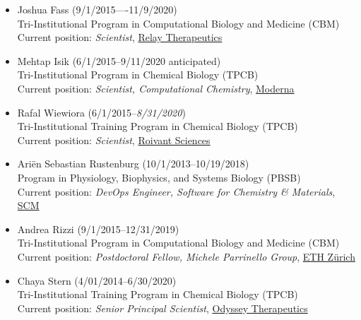 \documentclass[10pt]{article}
\begin{document}
\begin{itemize}

  \item Joshua Fass (9/1/2015----11/9/2020)\\
  Tri-Institutional Program in Computational Biology and Medicine (CBM)\\
  Current position: \emph{Scientist}, \href{https://relaytx.com/}{Relay Therapeutics}
  
  \item Mehtap Isik (6/1/2015--9/11/2020 anticipated)\\
  Tri-Institutional Program in Chemical Biology (TPCB)\\
  Current position: \emph{Scientist, Computational Chemistry}, \href{https://www.modernatx.com/}{Moderna}
  
  \item Rafal Wiewiora (6/1/2015--\emph{8/31/2020})\\
  Tri-Institutional Training Program in Chemical Biology (TPCB)\\
  Current position: \emph{Scientist}, \href{redesignscience.com}{Roivant Sciences}
  
  \item Ari\"{e}n Sebastian Rustenburg (10/1/2013--10/19/2018)\\
  Program in Physiology, Biophysics, and Systems Biology (PBSB)\\
  Current position: \emph{DevOps Engineer, Software for Chemistry \& Materials}, \href{https://www.scm.com/}{SCM}

  \item Andrea Rizzi (9/1/2015--12/31/2019)\\
  Tri-Institutional Program in Computational Biology and Medicine (CBM)\\
  Current position: \emph{Postdoctoral Fellow, Michele Parrinello Group}, \href{https://parrinello.ethz.ch/}{ETH Z\"urich}

  \item Chaya Stern (4/01/2014--6/30/2020)\\
  Tri-Institutional Training Program in Chemical Biology (TPCB)\\
  Current position: \emph{Senior Principal Scientist},  \href{https://odysseytx.com/}{Odyssey Therapeutics}
 

\end{itemize}
\end{document}

